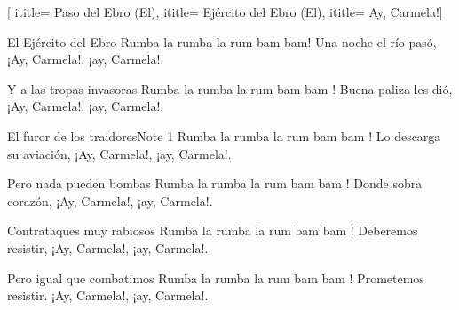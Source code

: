  [
ititle= {Paso del Ebro (El)},
ititle= {Ejército del Ebro (El)},
ititle= {Ay, Carmela!}]


\beginverse
El Ejército del Ebro
Rumba la rumba la rum bam bam!
Una noche el río pasó,
¡Ay, Carmela!, ¡ay, Carmela!.
\endverse

\beginverse
Y a las tropas invasoras
Rumba la rumba la rum bam bam !
Buena paliza les dió,
¡Ay, Carmela!, ¡ay, Carmela!.
\endverse

\beginverse
El furor de los traidoresNote 1
Rumba la rumba la rum bam bam !
Lo descarga su aviación,
¡Ay, Carmela!, ¡ay, Carmela!.
\endverse

\beginverse
Pero nada pueden bombas
Rumba la rumba la rum bam bam !
Donde sobra corazón,
¡Ay, Carmela!, ¡ay, Carmela!.
\endverse

\beginverse
Contrataques muy rabiosos
Rumba la rumba la rum bam bam !
Deberemos resistir,
¡Ay, Carmela!, ¡ay, Carmela!.
\endverse

\beginverse
Pero igual que combatimos
Rumba la rumba la rum bam bam !
Prometemos resistir.
¡Ay, Carmela!, ¡ay, Carmela!.
\endverse

\endsong